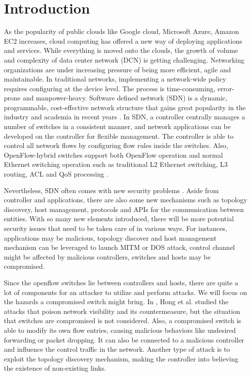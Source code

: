 \chapter{Introduction}
\label{chap:intro}
\setcounter{page}{1}

As the popularity of public clouds like Google cloud, Microsoft Azure, Amazon EC2 increases, cloud computing has offered a new way of deploying applications and services. While everything is moved onto the clouds, the growth of volume and complexity of data center network (DCN) is getting challenging. Networking organizations are under increasing pressure of being more efficient, agile and maintainable. In traditional networks, implementing a network-wide policy requires configuring at the device level. The process is time-consuming, error-prone and manpower-heavy. Software defined network (SDN) is a dynamic, programmable, cost-effective network structure that gains great popularity in the industry and academia in recent years \cite{KRVRAU15, MABPPRST08, LHM10}. In SDN, a controller centrally manages a number of switches in a consistent manner, and network applications can be developed on the controller for flexible management. The controller is able to control all network flows by configuring flow rules inside the switches. Also, OpenFlow-hybrid switches support both OpenFlow operation and normal Ethernet switching operation such as traditional L2 Ethernet switching, L3 routing, ACL and QoS processing \cite{OF_SPEC}.

Nevertheless, SDN often comes with new security problems \cite{SOS13, CM}. Aside from controller and applications, there are also some new mechanisms such as topology discovery, host management, protocols and APIs for the communication between entities. With so many new elements introduced, there will be more potential security issues that need to be taken care of in various ways. For instances, applications may be malicious, topology discover and host management mechanism can be leveraged to launch MITM or DOS attack, control channel might be affected by malicious controllers, switches and hosts may be compromised.

Since the openflow switches lie between controllers and hosts, there are quite a lot of components for an attacker to utilize and perform attacks. We will focus on the hazards a compromised switch might bring.
In \cite{HXWG15}, Hong et al. studied the attacks that poison network visibility and its countermeasure, but the situation that switches are compromised is not considered. Also, a compromised switch is able to modify its own flow entries, causing malicious behaviors like undesired forwarding or packet dropping. It can also be connected to a malicious controller and influence the control traffic in the network. Another type of attack is to exploit the topology discovery mechanism, making the controller into believing the existence of non-existing links.

